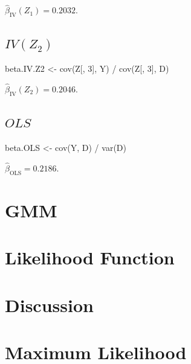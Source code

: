 \documentclass[9pt,twocolumn,twoside,]{pnas-new}
\newenvironment{Shaded}{}{}
\newcommand{\DecValTok}[1]{\textcolor[rgb]{0.25,0.63,0.44}{#1}}
\newcommand{\FunctionTok}[1]{\textcolor[rgb]{0.02,0.16,0.49}{#1}}
\newcommand{\NormalTok}[1]{#1}
\newcommand{\OtherTok}[1]{\textcolor[rgb]{0.00,0.44,0.13}{#1}}
\newcommand{\SpecialCharTok}[1]{\textcolor[rgb]{0.25,0.44,0.63}{#1}}
\begin{document}
\(\hat{\beta}_{\text{IV}} (Z_1) = 0.2032\).

\hypertarget{ivz_2}{%
\subsection{\texorpdfstring{\(IV(Z_2)\)}{IV(Z\_2)}}\label{ivz_2}}

\begin{Shaded}
\begin{Highlighting}[]
\NormalTok{beta.IV.Z2 }\OtherTok{\textless{}{-}} \FunctionTok{cov}\NormalTok{(Z[, }\DecValTok{3}\NormalTok{], Y) }\SpecialCharTok{/} \FunctionTok{cov}\NormalTok{(Z[, }\DecValTok{3}\NormalTok{], D)}
\end{Highlighting}
\end{Shaded}

\(\hat{\beta}_{\text{IV}} (Z_2) = 0.2046\).

\hypertarget{ols}{%
\subsection{\texorpdfstring{\(OLS\)}{OLS}}\label{ols}}

\begin{Shaded}
\begin{Highlighting}[]
\NormalTok{beta.OLS }\OtherTok{\textless{}{-}} \FunctionTok{cov}\NormalTok{(Y, D) }\SpecialCharTok{/} \FunctionTok{var}\NormalTok{(D)}
\end{Highlighting}
\end{Shaded}

\(\hat{\beta}_{\text{OLS}} = 0.2186\).

\hypertarget{gmm}{%
\section{GMM}\label{gmm}}

\hypertarget{likelihood-function}{%
\section{Likelihood Function}\label{likelihood-function}}

\hypertarget{discussion}{%
\section{Discussion}\label{discussion}}

\hypertarget{maximum-likelihood}{%
\section{Maximum Likelihood}\label{maximum-likelihood}}

\showmatmethods
\showacknow
\pnasbreak



% 
\end{document}
